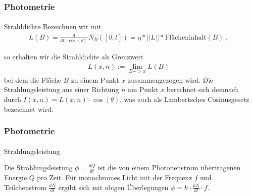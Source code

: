 \documentclass{beamer}
\begin{document}
\begin{frame}
    \frametitle{Photometrie}
\framesubtitle{}

\begin{block}{Strahldichte}
Bezeichnen wir mit 
\begin{align*}
L(B) = \frac{d}{dt \cdot \cos(\theta)}N_B([0,t]) = \eta * ||L||  *  \text{Flächeninhalt} (B) \; , 
 \end{align*}

so erhalten wir die   Strahldichte als Grenzwert
\begin{align*}
L(x, n):= \lim_{B -> x} L(B)
 \end{align*}
bei dem die Fläche $B$  zu einem Punkt $x$ zusammengezogen wird.  Die Strahlungsleistung aus einer Richtung $n$  am Punkt $x$ berechnet sich demnach durch $I(x, n) = L(x, n) \cdot \cos(\theta)$, was auch als Lambertsches Cosinusgesetz bezeichnet wird.
\end{block}
\end{frame}
 

\begin{frame}
    \frametitle{Photometrie}
\framesubtitle{}
\begin{block}{Strahlungsleistung}

Die Strahlungsleistung $\phi = \frac{d Q}{dt}$ ist die von einem Photonenstrom übertragenen Energie $Q$ pro Zeit. 
Für monochromes Licht mit der Frequenz $f$ und Teilchenstrom $ \frac{d N}{dt} $ ergibt sich mit obigen Überlegungen $\phi = h \cdot  \frac{d N}{dt}  \cdot f$.
\end{block}
\end{frame}
\end{document}
